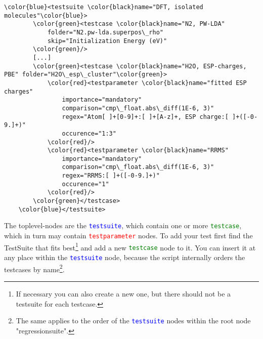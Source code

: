\documentclass[a4paper,12pt]{scrartcl}
\newcommand{\testsuite}{\textcolor{blue}{\texttt{testsuite}}}
\newcommand{\testcase}{\textcolor{green}{\texttt{testcase}}}
\newcommand{\testparameter}{\textcolor{red}{\texttt{testparameter}}}
\begin{document}
\begin{Verbatim}[commandchars=\\\{\},gobble=4, frame=single, framesep=2mm, label=excerpt from testsuite.xml,
labelposition=bottomline]
    \color{blue}<testsuite \color{black}name="DFT, isolated molecules"\color{blue}>
        \color{green}<testcase \color{black}name="N2, PW-LDA"
            folder="N2.pw-lda.superpos\_rho"
            skip="Initialization Energy (eV)"
        \color{green}/>
        [...]
        \color{green}<testcase \color{black}name="H2O, ESP-charges, PBE" folder="H2O\_esp\_cluster"\color{green}>
            \color{red}<testparameter \color{black}name="fitted ESP charges"
                importance="mandatory"
                comparison="cmp\_float.abs\_diff(1E-6, 3)"
                regex="Atom[ ]+[0-9]+:[ ]+[A-z]+, ESP charge:[ ]+([-0-9.]+)"
                occurence="1:3"
            \color{red}/>
            \color{red}<testparameter \color{black}name="RRMS"
                importance="mandatory"
                comparison="cmp\_float.abs\_diff(1E-6, 3)"
                regex="RRMS:[ ]+([-0-9.]+)"
                occurence="1"
            \color{red}/>
        \color{green}</testcase>
    \color{blue}</testsuite>
\end{Verbatim}
The toplevel-nodes are the \testsuite{}, which contain one or more \testcase{}, which in turn may contain
\testparameter{} nodes. To add your test first find the TestSuite that fits best\footnote{If necessary you can also
create a new one, but there should not be a testsuite for each testcase.} and add a new \testcase{} node to it. You
can insert it at any place within the \testsuite{} node, because the script internally orders the testcases by
name\footnote{The same applies to the order of the \testsuite{} nodes within the root node "regressionsuite".}.
\end{document}
